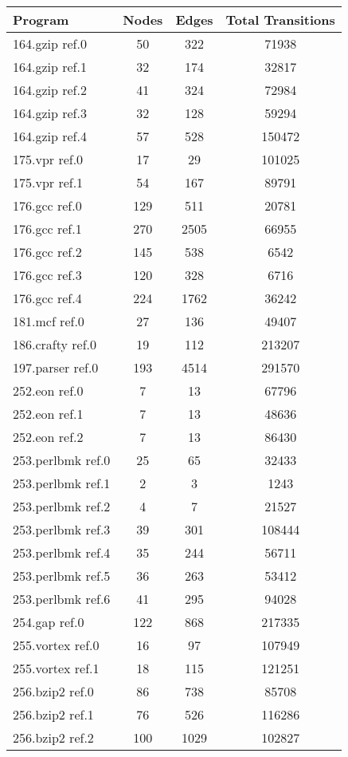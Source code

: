 \begin{table}[ht!]
\center
\begin{tabular}{|p{1.3in}|c|c|c|}
\hline
Program&Nodes&Edges&Total Transitions\\
\hline\hline
164.gzip ref.0&50&322&71938\\
\hline
164.gzip ref.1&32&174&32817\\
\hline
164.gzip ref.2&41&324&72984\\
\hline
164.gzip ref.3&32&128&59294\\
\hline
164.gzip ref.4&57&528&150472\\
\hline
175.vpr ref.0&17&29&101025\\
\hline
175.vpr ref.1&54&167&89791\\
\hline
176.gcc ref.0&129&511&20781\\
\hline
176.gcc ref.1&270&2505&66955\\
\hline
176.gcc ref.2&145&538&6542\\
\hline
176.gcc ref.3&120&328&6716\\
\hline
176.gcc ref.4&224&1762&36242\\
\hline
181.mcf ref.0&27&136&49407\\
\hline
186.crafty ref.0&19&112&213207\\
\hline
197.parser ref.0&193&4514&291570\\
\hline
252.eon ref.0&7&13&67796\\
\hline
252.eon ref.1&7&13&48636\\
\hline
252.eon ref.2&7&13&86430\\
\hline
253.perlbmk ref.0&25&65&32433\\
\hline
253.perlbmk ref.1&2&3&1243\\
\hline
253.perlbmk ref.2&4&7&21527\\
\hline
253.perlbmk ref.3&39&301&108444\\
\hline
253.perlbmk ref.4&35&244&56711\\
\hline
253.perlbmk ref.5&36&263&53412\\
\hline
253.perlbmk ref.6&41&295&94028\\
\hline
254.gap ref.0&122&868&217335\\
\hline
255.vortex ref.0&16&97&107949\\
\hline
255.vortex ref.1&18&115&121251\\
\hline
256.bzip2 ref.0&86&738&85708\\
\hline
256.bzip2 ref.1&76&526&116286\\
\hline
256.bzip2 ref.2&100&1029&102827\\

\end{tabular}
\end{table}
